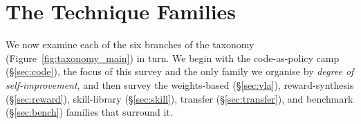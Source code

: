 \section{The Technique Families}
\label{sec:techniques}

We now examine each of the six branches of the taxonomy (Figure~\ref{fig:taxonomy_main}) in
turn. We begin with the code-as-policy camp (\S\ref{sec:code}), the focus of this survey and
the only family we organise by \emph{degree of self-improvement}, and then survey the
weights-based (\S\ref{sec:vla}), reward-synthesis (\S\ref{sec:reward}), skill-library
(\S\ref{sec:skill}), transfer (\S\ref{sec:transfer}), and benchmark (\S\ref{sec:bench})
families that surround it.
